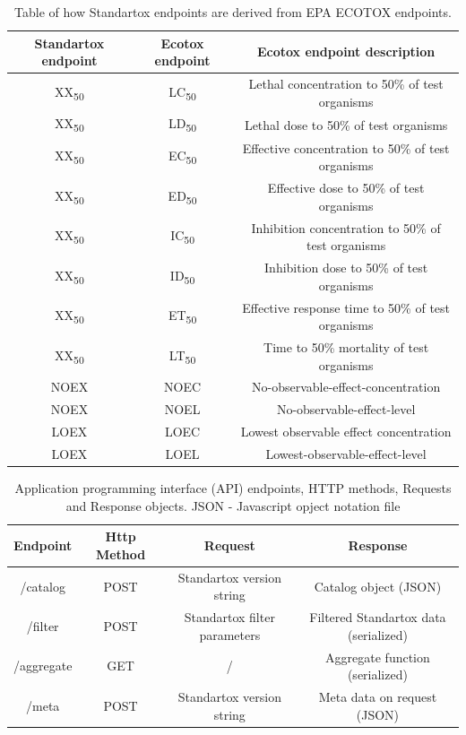 \documentclass[journal,datadescriptor,accept,moreauthors,pdftex]{Definitions/mdpi}
\begin{document}
\begin{table}[H]
    \caption{Table of how Standartox endpoints are derived from EPA ECOTOX endpoints.}
    \label{tab:endpoints-conflate}
    \centering
\begin{tabular}{ccc}
    \toprule
    \textbf{Standartox endpoint} & \textbf{Ecotox endpoint} & \textbf{Ecotox endpoint description} \\
    \midrule
    XX\textsubscript{50} & LC\textsubscript{50} & Lethal concentration to 50\% of test organisms \\
    XX\textsubscript{50} & LD\textsubscript{50} & Lethal dose to 50\% of test organisms \\
    XX\textsubscript{50} & EC\textsubscript{50} & Effective concentration to 50\% of test organisms \\
    XX\textsubscript{50} & ED\textsubscript{50} & Effective dose to 50\% of test organisms \\
    XX\textsubscript{50} & IC\textsubscript{50} & Inhibition concentration to 50\% of test organisms \\
    XX\textsubscript{50} & ID\textsubscript{50} & Inhibition dose to 50\% of test organisms \\
    XX\textsubscript{50} & ET\textsubscript{50} & Effective response time to 50\% of test organisms \\
    XX\textsubscript{50} & LT\textsubscript{50} & Time to 50\% mortality of test organisms \\
    NOEX & NOEC & No-observable-effect-concentration \\
    NOEX & NOEL & No-observable-effect-level \\
    LOEX & LOEC & Lowest observable effect concentration\\
    LOEX & LOEL & Lowest-observable-effect-level \\
    \bottomrule
\end{tabular}
\end{table}

\begin{table}[H]
    \caption{Application programming interface (API) endpoints, HTTP methods, Requests and Response objects. JSON - Javascript opject notation file}
    \label{tab:api-endpoints}
    \centering
\begin{tabular}{cccc}
    \toprule
    \textbf{Endpoint} & \textbf{Http Method} & \textbf{Request} & \textbf{Response} \\
    \midrule
    /catalog & POST & Standartox version string & Catalog object (JSON) \\
    /filter & POST & Standartox filter parameters & Filtered Standartox data (serialized) \\
    /aggregate & GET & / & Aggregate function (serialized) \\
    /meta & POST & Standartox version string & Meta data on request (JSON) \\
    \bottomrule
\end{tabular}
\end{table}
\end{document}
